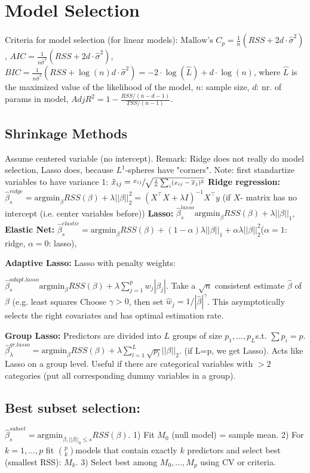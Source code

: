 \section*{Model Selection}
Criteria for model selection (for linear models): 
$\text{Mallow's }C_p=\tfrac 1 n (RSS + 2d\cdot \hat\sigma^2)$, 
$AIC = \tfrac{1}{n\hat\sigma^2}(RSS+2d\cdot\hat\sigma^2)$, 
$BIC= \tfrac{1}{n\hat\sigma^2}(RSS+\log(n)d\cdot\hat\sigma^2) = -2 \cdot\log(\hat L) + d\cdot\log(n)$, 
where $\hat L$ is the maximized value of the likelihood of the model, 
$n$: sample size, $d$: nr. of params in model, $AdjR^2=1-\tfrac{RSS / (n-d-1)}{TSS / (n-1)}$.

\subsection*{Shrinkage Methods}
Assume centered variable (no intercept).
Remark: Ridge does not really do model selection, Lasso does, because $L^1$-spheres have "corners".
Note: first standartize variables to have variance 1: $\tilde x_{ij}=\sfrac{x_{ij}}{\sqrt{\tfrac{1}{n} \sum_i(x_{ij}- \overline x_j)^2}}$
\textbf{Ridge regression:} $\hat\beta_s^{ridge} = \text{argmin}_\beta RSS(\beta) + \lambda ||\beta||_2^2 = (X^\top X + \lambda I)^{-1}X^\top y$ (if $X$- matrix has no intercept (i.e. center variables before))
\textbf{Lasso:} $\hat\beta_s^{lasso}\text{argmin}_\beta RSS(\beta) + \lambda ||\beta||_1$,
\textbf{Elastic Net:} $\hat\beta_s^{elastic} = \text{argmin}_\beta RSS(\beta)+(1-\alpha)\lambda||\beta||_1 + \alpha \lambda ||\beta||_2^2$($\alpha=1$: ridge, $\alpha=0$: lasso),

\textbf{Adaptive Lasso:} Lasso with penalty weights:

$\hat\beta_s^{adapt.lasso}\text{argmin}_\beta RSS(\beta) + \lambda \sum_{j=1}^p w_j |\beta_j|$. Take a $\sqrt{n}$ consistent estimate $\hat\beta$ of $\beta$ (e.g. least squares Choose $\gamma>0$, then set $\hat w_j = {1}/{|\hat\beta|^\gamma}$.
This asymptotically selects the right covariates and has optimal estimation rate.

\textbf{Group Lasso:} Predictors are divided into $L$ groups of size $p_1, ..., p_L$s.t. $\sum p_i = p$. $\hat\beta_\lambda^{gr.lasso}=\text{argmin}_\beta RSS(\beta)+\lambda \sum_{l=1}^L \sqrt{p_l} ||\beta||_2$. (if L=p, we get Lasso).
Acts like Lasso on a group level.
Useful if there are categorical variables with $>2$ categories (put all corresponding dummy variables in a group).

\subsection*{Best subset selection:}
$\hat\beta_s^{subset} = \text{argmin}_{\beta, ||\beta||_0 \leq s} RSS(\beta)$. 1) Fit $M_0$ (null model) = sample mean. 2) For $k=1,...,p$ fit $\binom p k$models that contain exactly $k$ predictors and select best (smallest RSS): $M_k$. 3) Select best among $M_0, ..., M_p$ using CV or criteria.

